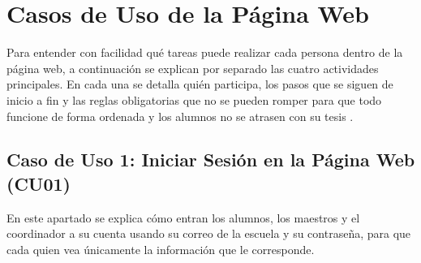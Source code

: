 \section{Casos de Uso de la Página Web}
\label{sec:casos_uso}

Para entender con facilidad qué tareas puede realizar cada persona dentro de la página web, a continuación se explican por separado las cuatro actividades principales. En cada una se detalla quién participa, los pasos que se siguen de inicio a fin y las reglas obligatorias que no se pueden romper para que todo funcione de forma ordenada y los alumnos no se atrasen con su tesis \parencite{sim2023technology}.

\subsection{Caso de Uso 1: Iniciar Sesión en la Página Web (CU01)}
\label{subsec:cu01}

En este apartado se explica cómo entran los alumnos, los maestros y el coordinador a su cuenta usando su correo de la escuela y su contraseña, para que cada quien vea únicamente la información que le corresponde.

